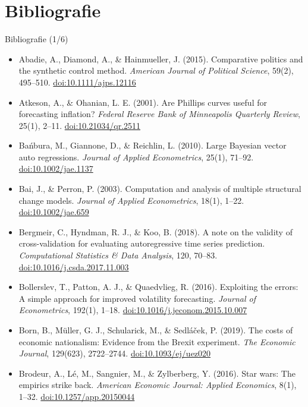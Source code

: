 \section{Bibliografie}

\begin{frame}{Bibliografie (1/6)}
\itemsize{\tiny}
\begin{itemize}
    \item Abadie, A., Diamond, A., \& Hainmueller, J. (2015). Comparative politics and the synthetic control method. \textit{American Journal of Political Science}, 59(2), 495--510. \href{https://doi.org/10.1111/ajps.12116}{doi:10.1111/ajps.12116}
    \item Atkeson, A., \& Ohanian, L. E. (2001). Are Phillips curves useful for forecasting inflation? \textit{Federal Reserve Bank of Minneapolis Quarterly Review}, 25(1), 2--11. \href{https://doi.org/10.21034/qr.2511}{doi:10.21034/qr.2511}
    \item Bańbura, M., Giannone, D., \& Reichlin, L. (2010). Large Bayesian vector auto regressions. \textit{Journal of Applied Econometrics}, 25(1), 71--92. \href{https://doi.org/10.1002/jae.1137}{doi:10.1002/jae.1137}
    \item Bai, J., \& Perron, P. (2003). Computation and analysis of multiple structural change models. \textit{Journal of Applied Econometrics}, 18(1), 1--22. \href{https://doi.org/10.1002/jae.659}{doi:10.1002/jae.659}
    \item Bergmeir, C., Hyndman, R. J., \& Koo, B. (2018). A note on the validity of cross-validation for evaluating autoregressive time series prediction. \textit{Computational Statistics \& Data Analysis}, 120, 70--83. \href{https://doi.org/10.1016/j.csda.2017.11.003}{doi:10.1016/j.csda.2017.11.003}
    \item Bollerslev, T., Patton, A. J., \& Quaedvlieg, R. (2016). Exploiting the errors: A simple approach for improved volatility forecasting. \textit{Journal of Econometrics}, 192(1), 1--18. \href{https://doi.org/10.1016/j.jeconom.2015.10.007}{doi:10.1016/j.jeconom.2015.10.007}
    \item Born, B., Müller, G. J., Schularick, M., \& Sedláček, P. (2019). The costs of economic nationalism: Evidence from the Brexit experiment. \textit{The Economic Journal}, 129(623), 2722--2744. \href{https://doi.org/10.1093/ej/uez020}{doi:10.1093/ej/uez020}
    \item Brodeur, A., Lé, M., Sangnier, M., \& Zylberberg, Y. (2016). Star wars: The empirics strike back. \textit{American Economic Journal: Applied Economics}, 8(1), 1--32. \href{https://doi.org/10.1257/app.20150044}{doi:10.1257/app.20150044}

\end{itemize}
\end{frame}
